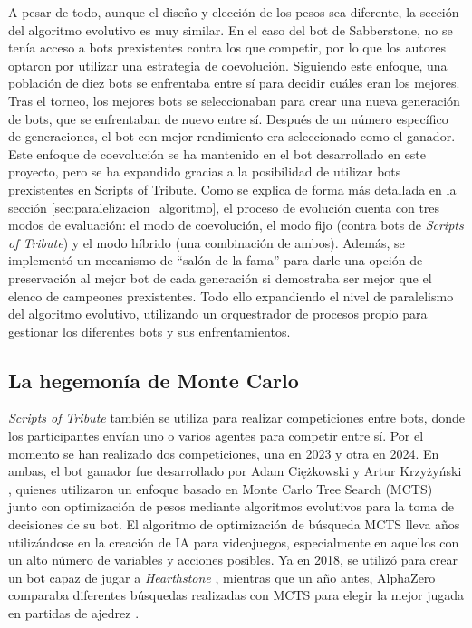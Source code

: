 A pesar de todo, aunque el diseño y elección de los pesos sea diferente, la sección del algoritmo evolutivo es muy similar. En el caso del bot de Sabberstone, no se tenía acceso a bots prexistentes contra los que competir, por lo que los autores optaron por utilizar una estrategia de coevolución. Siguiendo este enfoque, una población de diez bots se enfrentaba entre sí para decidir cuáles eran los mejores. Tras el torneo, los mejores bots se seleccionaban para crear una nueva generación de bots, que se enfrentaban de nuevo entre sí. Después de un número específico de generaciones, el bot con mejor rendimiento era seleccionado como el ganador. Este enfoque de coevolución se ha mantenido en el bot desarrollado en este proyecto, pero se ha expandido gracias a la posibilidad de utilizar bots prexistentes en Scripts of Tribute. Como se explica de forma más detallada en la sección \ref{sec:paralelizacion_algoritmo}, el proceso de evolución cuenta con tres modos de evaluación: el modo de coevolución, el modo fijo (contra bots de \textit{Scripts of Tribute}) y el modo híbrido (una combinación de ambos). Además, se implementó un mecanismo de ``salón de la fama'' para darle una opción de preservación al mejor bot de cada generación si demostraba ser mejor que el elenco de campeones prexistentes. Todo ello expandiendo el nivel de paralelismo del algoritmo evolutivo, utilizando un orquestrador de procesos propio para gestionar los diferentes bots y sus enfrentamientos.


\subsection{La hegemonía de Monte Carlo} \label{sec:mcts_cog}

\textit{Scripts of Tribute} también se utiliza para realizar competiciones entre bots, donde los participantes envían uno o varios agentes para competir entre sí. Por el momento se han realizado dos competiciones, una en 2023 y otra en 2024. En ambas, el bot ganador fue desarrollado por Adam Ciężkowski y Artur Krzyżyński \cite{adam_ciezkowski_developing_2023}, quienes utilizaron un enfoque basado en Monte Carlo Tree Search (MCTS) junto con optimización de pesos mediante algoritmos evolutivos para la toma de decisiones de su bot. El algoritmo de optimización de búsqueda MCTS lleva años utilizándose en la creación de IA para videojuegos, especialmente en aquellos con un alto número de variables y acciones posibles. Ya en 2018, se utilizó para crear un bot capaz de jugar a \textit{Hearthstone} \cite{swiechowski_improving_2018}, mientras que un año antes, AlphaZero comparaba diferentes búsquedas realizadas con MCTS para elegir la mejor jugada en partidas de ajedrez \cite{silver_mastering_2017}.

